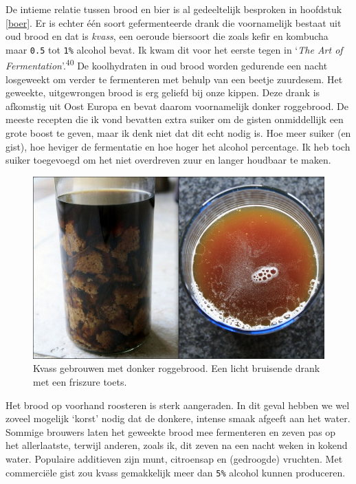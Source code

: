 \documentclass[
  11pt,
  dutch,
]{memoir}
\begin{document}
\label{kvass}

De intieme relatie tussen brood en bier is al gedeeltelijk besproken in
hoofdstuk \ref{boer}. Er is echter één soort gefermenteerde drank die
voornamelijk bestaat uit oud brood en dat is \emph{kvass}, een oeroude
biersoort die zoals kefir en kombucha maar \texttt{0.5} tot \texttt{1\%}
alcohol bevat. Ik kwam dit voor het eerste tegen in `\emph{The Art of
Fermentation}'.\textsuperscript{40} De koolhydraten in oud brood worden
gedurende een nacht losgeweekt om verder te fermenteren met behulp van
een beetje zuurdesem. Het geweekte, uitgewrongen brood is erg geliefd
bij onze kippen. Deze drank is afkomstig uit Oost Europa en bevat daarom
voornamelijk donker roggebrood. De meeste recepten die ik vond bevatten
extra suiker om de gisten onmiddellijk een grote boost te geven, maar ik
denk niet dat dit echt nodig is. Hoe meer suiker (en gist), hoe heviger
de fermentatie en hoe hoger het alcohol percentage. Ik heb toch suiker
toegevoegd om het niet overdreven zuur en langer houdbaar te maken.

\begin{figure}
    \centering
    \includegraphics{img/bw/kvass.jpg}
    \caption[Kvass gebrouwen met donker roggebrood.]{Kvass gebrouwen met donker roggebrood. Een licht bruisende drank met een friszure toets.}
\end{figure}

Het brood op voorhand roosteren is sterk aangeraden. In dit geval hebben
we wel zoveel mogelijk `korst' nodig dat de donkere, intense smaak
afgeeft aan het water. Sommige brouwers laten het geweekte brood mee
fermenteren en zeven pas op het allerlaatste, terwijl anderen, zoals ik,
dit zeven na een nacht weken in kokend water. Populaire additieven zijn
munt, citroensap en (gedroogde) vruchten. Met commerciële gist zou kvass
gemakkelijk meer dan \texttt{5\%} alcohol kunnen produceren.
\end{document}
